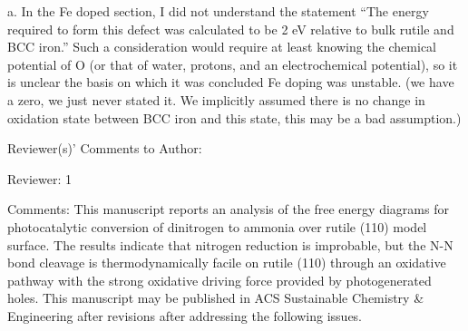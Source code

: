 a.      In the Fe doped section, I did not understand the statement “The energy required to form this defect was calculated to be 2 eV relative to bulk rutile and BCC iron.”  Such a consideration would require at least knowing the chemical potential of O (or that of water, protons, and an electrochemical potential), so it is unclear the basis on which it was concluded Fe doping was unstable. (we have a zero, we just never stated it. We implicitly assumed there is no change in oxidation state between BCC iron and this state, this may be a bad assumption.)


























Reviewer(s)' Comments to Author:

Reviewer: 1

Comments:
This manuscript reports an analysis of the free energy diagrams for photocatalytic conversion of dinitrogen to ammonia over rutile (110) model surface. The results indicate that nitrogen reduction is improbable, but the N-N bond cleavage is thermodynamically facile on rutile (110) through an oxidative pathway with the strong oxidative driving force provided by photogenerated holes. This manuscript may be published in ACS Sustainable Chemistry & Engineering after revisions after addressing the following issues.

